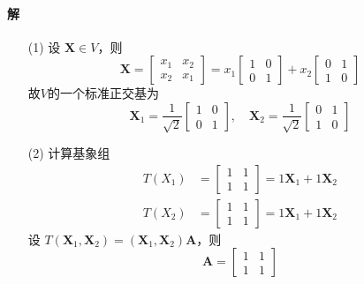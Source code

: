 \documentclass[12pt, a4paper, oneside, fontset=none]{ctexart}
\begin{document}
\paragraph*{解}
\begin{enumerate}
    \item[(1)]
        设 $\bm{X} \in V$，则
        \[
            \bm{X} = \begin{bmatrix}
                x_1 & x_2 \\
                x_2 & x_1
            \end{bmatrix} = x_1 \begin{bmatrix}
                1 & 0 \\
                0 & 1
            \end{bmatrix} + x_2 \begin{bmatrix}
                0 & 1 \\
                1 & 0
            \end{bmatrix}
        \]
        故$V$的一个标准正交基为
        \[
            \bm{X}_1 = \dfrac{1}{\sqrt{2}}\begin{bmatrix}
                1 & 0 \\
                0 & 1
            \end{bmatrix},\quad \bm{X}_2 = \dfrac{1}{\sqrt{2}}\begin{bmatrix}
                0 & 1 \\
                1 & 0
            \end{bmatrix}
        \]
    \item[(2)]
        计算基象组
        \begin{align*}
            T(X_1) & =
            \begin{bmatrix}
                1 & 1 \\
                1 & 1
            \end{bmatrix} = 1\bm{X}_1 + 1\bm{X}_2 \\
            T(X_2) & =
            \begin{bmatrix}
                1 & 1 \\
                1 & 1
            \end{bmatrix} = 1\bm{X}_1 + 1\bm{X}_2
        \end{align*}
        设 $T(\bm{X}_1,\bm{X}_2) = (\bm{X}_1,\bm{X}_2)\bm{A}$，则
        \[
            \bm{A} = \begin{bmatrix}
                1 & 1 \\
                1 & 1
            \end{bmatrix}
\]
\end{enumerate}
\end{document}
